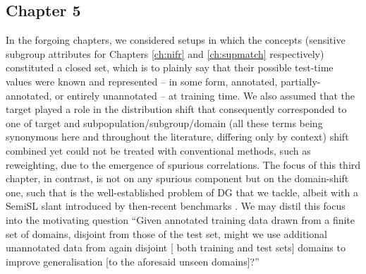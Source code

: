\subsection*{Chapter 5}%
%
In the forgoing chapters, we considered setups in which the concepts (sensitive subgroup attributes
for Chapters \ref{ch:nifr} and \ref{ch:supmatch} respectively) constituted a closed set, which is
to plainly say that their possible test-time values were known and represented -- in some form,
annotated, partially-annotated, or entirely unannotated -- at training time.
%
We also assumed that the target played a role in the distribution shift that consequently
corresponded to one of target and subpopulation/subgroup/domain (all these terms being synonymous
here and throughout the literature, differing only by context) shift combined yet could not be
treated with conventional methods, such as reweighting, due to the emergence of spurious
correlations.
%
The focus of this third chapter, in contrast, is not on any spurious component but on the
domain-shift one, such that is the well-established problem of \ac{DG} that we tackle, albeit with
a \ac{SemiSL} slant introduced by then-recent benchmarks \citep{SagWeiLeeGaoetal22}. 
%
We may distil this focus into the motivating question ``Given annotated training data drawn from a
finite set of domains, disjoint from those of the test set, might we use additional unannotated
data from again disjoint [\wrt{} both training and test sets] domains to improve generalisation [to
the aforesaid unseen domains]?''
%

